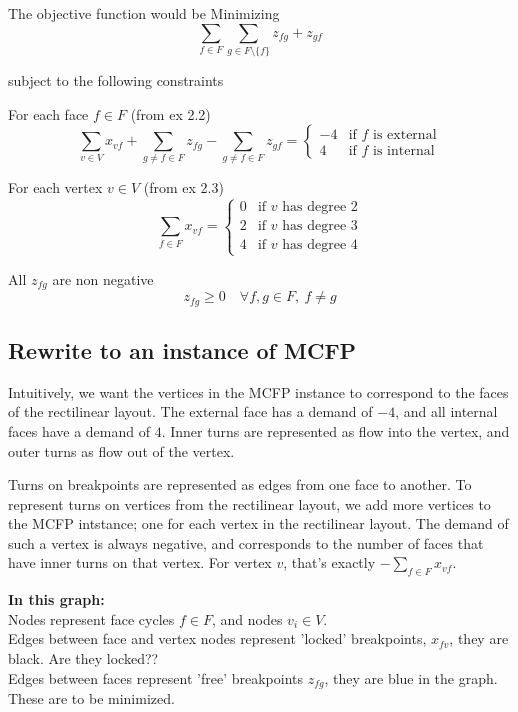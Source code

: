The objective function would be Minimizing
$$ \sum_{f\in F} \sum_{g \in F \setminus{\{f\} }} {z_{fg} + z_{gf} }$$

subject to the following constraints

For each face $f \in F$ (from ex 2.2)
$$\sum_{v \in V}{x_{vf}} + \sum_{g \neq f \in F}{z_{fg}} - \sum_{g \neq f \in F}{z_{gf}} = \begin{cases} -4 & \text{if $f$ is external} \\ 4 & \text{if $f$ is internal}\end{cases}
$$

For each vertex $v \in V$ (from ex 2.3)
$$  \sum_{f \in F} {x_{vf}} = \begin{cases}
                                0 & \text{if $v$ has degree } 2 \\
                                2 & \text{if $v$ has degree } 3 \\
                                4 & \text{if $v$ has degree } 4
                              \end{cases}
$$

All $z_{fg}$ are non negative
$$ z_{fg} \ge 0 \quad \forall f, g \in F, \:f\neq g $$

\subsection{Rewrite to an instance of MCFP}

Intuitively, we want the vertices in the MCFP instance to correspond to the faces of the rectilinear layout. The external face has a demand of $-4$, and all internal faces have a demand of $4$. Inner turns are represented as flow into the vertex, and outer turns as flow out of the vertex.

Turns on breakpoints are represented as edges from one face to another. To represent turns on vertices from the rectilinear layout, we add more vertices to the MCFP intstance; one for each vertex in the rectilinear layout. The demand of such a vertex is always negative, and corresponds to the number of faces that have inner turns on that vertex. For vertex $v$, that's exactly $-\sum_{f \in F}{x_{vf}}$.

\textbf{In this graph:} \\
Nodes represent face cycles $f \in F$, and nodes $v_i \in V$.\\
Edges between face and vertex nodes represent 'locked' breakpoints, $x_{fv}$, they are black. Are they locked??\\
Edges between faces represent 'free' breakpoints $z_{fg}$, they are blue in the graph. These are to be minimized.

